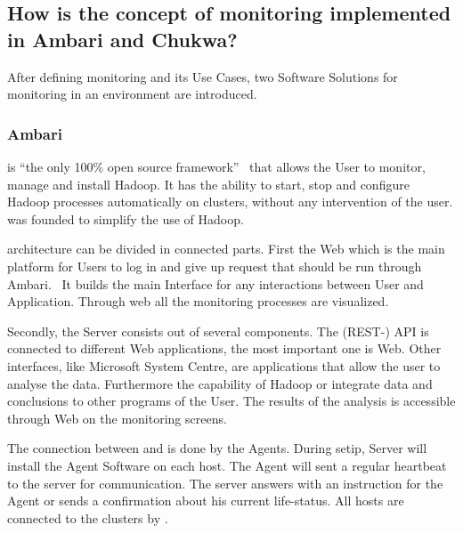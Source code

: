 \subsection{How is the concept of monitoring implemented in Ambari and Chukwa?}
\label{subsec:Implementation}
After defining monitoring and its Use Cases, two Software Solutions for monitoring in an \hadoop environment are introduced.

\subsubsection{Ambari}
\amb is ``the only 100\% open source framework''~\cite{Sako2013} that allows the User to monitor, manage and install Hadoop.\cite{ApacheSoftwareFoundation2015} It has the ability to start, stop and configure Hadoop processes automatically on clusters, without any intervention of the user.\cite{Hortonworks2013} \amb was founded to simplify the use of Hadoop.\cite{Hortonworks2013}

\amb architecture can be divided in connected parts. First the \amb Web which is the main platform for Users to log in and give up request that should be run through Ambari.~\cite{Sako} It builds the main Interface for any interactions between User and Application.\cite{Sako} Through \amb web all the monitoring processes are visualized. 

Secondly, the \amb Server consists out of several components.\cite{Sako} The (REST-) API is connected to different Web applications, the most important one is \amb Web.\cite{Sako} Other interfaces, like Microsoft System Centre, are applications that allow the user to analyse the data. Furthermore the capability of Hadoop or integrate data and conclusions to other programs of the User.\cite{Hortonworks2013} The results of the analysis is accessible through \amb Web on the monitoring screens.\cite{Sako}

The connection between \amb and \hadoop is done by the \amb Agents.\cite{Sako} During setip, \amb Server will install the \amb Agent Software on each host. The Agent will sent a regular heartbeat to the server for communication. The server answers with an instruction for the Agent or sends a confirmation about his current life-status.\cite{Sako} All hosts are connected to the clusters by \hadoop.\cite{Sako}

